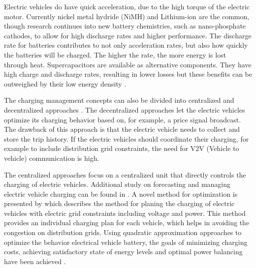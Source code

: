 Electric vehicles do have quick acceleration, due to the high torque of the electric motor. Currently nickel metal hydride (NiMH) and Lithium-ion are the common, though research continues into new battery chemistries, such as nano-phosphate cathodes, to allow for high discharge rates and higher performance. The discharge rate for batteries contributes to not only acceleration rates, but also how quickly the batteries will be charged. The higher the rate, the more energy is lost through heat. Supercapacitors are available as alternative components. They have high charge and discharge rates, resulting in lower losses but these benefits can be outweighed by their low energy density \cite{ZS_coi}.

The charging management concepts can also be divided into
centralized and decentralized approaches \cite{ZS_war}. The decentralized
approaches let the electric vehicles optimize its charging behavior
based on, for example, a price signal broadcast. The drawback
of this approach is that the electric vehicle needs to collect and store the
trip history. If the electric vehicles should coordinate their charging, for
example to include distribution grid constraints, the need for
V2V (Vehicle to vehicle) communication is high. 

The centralized approaches
focus on a centralized unit that directly controls the charging of electric vehicles. Additional study on forecasting and managing electric vehicle
charging can be found in \cite{ZS_rah,ZS_gal}. A novel method for optimization is presented by \cite{ZS_sun} which describes the method for planing the charging of electric vehicles with electric grid constraints including voltage and power. This method provides an individual charging plan for each vehicle, which helps in avoiding the congestion on distribution grids. Using quadratic approximation approaches to optimize the behavior electrical vehicle battery, the goals of minimizing charging costs, achieving satisfactory state of energy levels and optimal power balancing have been achieved \cite{ZS_sun2}.

